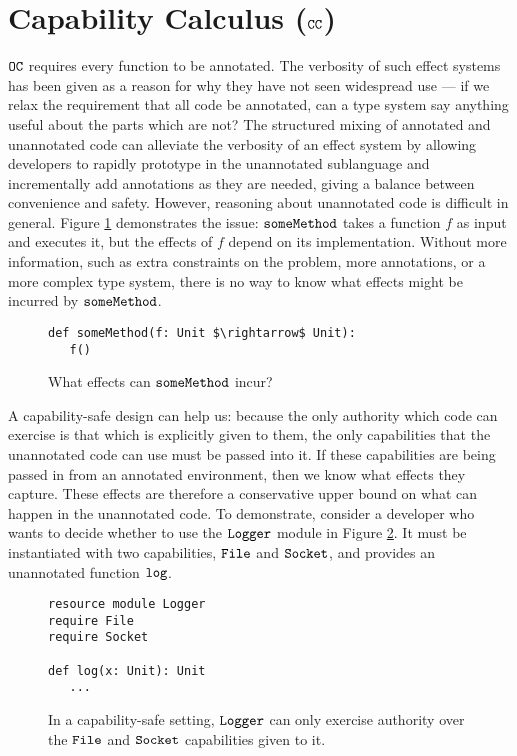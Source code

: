 



\section{Capability Calculus ($\mathtt{CC}$)}

$\mathtt{OC}$ requires every function to be annotated. The verbosity of such effect systems has been given as a reason for why they have not seen widespread use \cite{rytz2012} --- if we relax the requirement that all code be annotated, can a type system say anything useful about the parts which are not? The structured mixing of annotated and unannotated code can alleviate the verbosity of an effect system by allowing developers to rapidly prototype in the unannotated sublanguage and incrementally add annotations as they are needed, giving a balance between convenience and safety. However, reasoning about unannotated code is difficult in general. Figure \ref{fig:unannotated_reasoning} demonstrates the issue: $\mathtt{someMethod}$ takes a function $f$ as input and executes it, but the effects of $f$ depend on its implementation. Without more information, such as extra constraints on the problem, more annotations, or a more complex type system, there is no way to know what effects might be incurred by $\mathtt{someMethod}$.


\begin{figure}[h]
\begin{lstlisting}
def someMethod(f: Unit $\rightarrow$ Unit):
   f()
\end{lstlisting}
\vspace{-7pt}
\caption{What effects can $\mathtt{someMethod}$ incur?}
\label{fig:unannotated_reasoning}
\end{figure}

A capability-safe design can help us: because the only authority which code can exercise is that which is explicitly given to them, the only capabilities that the unannotated code can use must be passed into it. If these capabilities are being passed in from an annotated environment, then we know what effects they capture. These effects are therefore a conservative upper bound on what can happen in the unannotated code. To demonstrate, consider a developer who wants to decide whether to use the $\mathtt{Logger}$ module in Figure \ref{fig:cc_motivation}. It must be instantiated with two capabilities, $\mathtt{File}$ and $\mathtt{Socket}$, and provides an unannotated function $\mathtt{log}$.

\begin{figure}[h]
\begin{lstlisting}
resource module Logger
require File
require Socket

def log(x: Unit): Unit
   ...
\end{lstlisting}
\vspace{-7pt}
\caption{In a capability-safe setting, $\mathtt{Logger}$ can only exercise authority over the $\mathtt{File}$ and $\mathtt{Socket}$ capabilities given to it.}
\label{fig:cc_motivation}
\end{figure}

